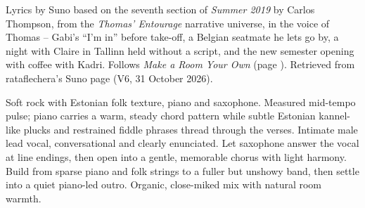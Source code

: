 
\label{sec:the-night-say-what-it-knew}
\begin{notes}
Lyrics by Suno based on the seventh section of \emph{Summer 2019} by Carlos Thompson, from the \emph{Thomas' Entourage} narrative universe, in the voice of Thomas -- Gabi's ``I'm in'' before take-off, a Belgian seatmate he lets go by, a night with Claire in Tallinn held without a script, and the new semester opening with coffee with Kadri. Follows \emph{Make a Room Your Own} (page \pageref{sec:make-a-room-your-own}). Retrieved from rataflechera's Suno page (V6, 31 October 2026).
\end{notes}
\begin{style}
Soft rock with Estonian folk texture, piano and saxophone. Measured mid-tempo pulse; piano carries a warm, steady chord pattern while subtle Estonian kannel-like plucks and restrained fiddle phrases thread through the verses. Intimate male lead vocal, conversational and clearly enunciated. Let saxophone answer the vocal at line endings, then open into a gentle, memorable chorus with light harmony. Build from sparse piano and folk strings to a fuller but unshowy band, then settle into a quiet piano-led outro. Organic, close-miked mix with natural room warmth.
\end{style}
